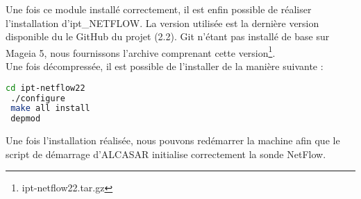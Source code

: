 Une fois ce module installé correctement, il est enfin possible de réaliser l'installation d'ipt\_NETFLOW. La version utilisée est la dernière version disponible du le GitHub du projet (2.2). Git n'étant pas installé de base sur Mageia 5, nous fournissons l'archive comprenant cette version\footnote{ipt-netflow22.tar.gz}.\\
Une fois décompressée, il est possible de l'installer de la manière suivante :
\begin{lstlisting}[language=bash,style=custombash]
 cd ipt-netflow22
 ./configure
 make all install
 depmod
\end{lstlisting}
Une fois l'installation réalisée, nous pouvons redémarrer la machine afin que le script de démarrage d'ALCASAR initialise correctement la sonde NetFlow.